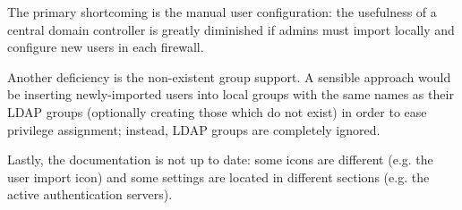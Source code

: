 \documentclass[draft]{homework}
\begin{document}
    The primary shortcoming is the manual user configuration: the usefulness of a central domain controller is greatly diminished if admins must import locally and configure new users in each firewall.
    
    Another deficiency is the non-existent group support.
    A sensible approach would be inserting newly-imported users into local groups with the same names as their LDAP groups (optionally creating those which do not exist) in order to ease privilege assignment; instead, LDAP groups are completely ignored.
    
    Lastly, the documentation is not up to date: some icons are different (e.g. the user import icon) and some settings are located in different sections (e.g. the active authentication servers).
\end{document}
